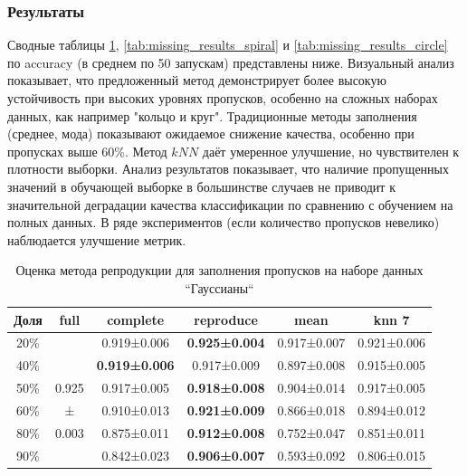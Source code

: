 \subsubsection{Результаты}
Сводные таблицы \cref{tab:missing_results_gaussians}, \cref{tab:missing_results_spiral} и \cref{tab:missing_results_circle} по accuracy (в среднем по 50 запускам) представлены ниже. Визуальный анализ показывает, что предложенный метод демонстрирует более высокую устойчивость при высоких уровнях пропусков, особенно на сложных наборах данных, как например "кольцо и круг". Традиционные методы заполнения (среднее, мода) показывают ожидаемое снижение качества, особенно при пропусках выше 60\%. Метод \(kNN\) даёт умеренное улучшение, но чувствителен к плотности выборки. Анализ результатов показывает, что наличие пропущенных значений в обучающей выборке в большинстве случаев не приводит к значительной деградации качества классификации по сравнению с обучением на полных данных. В ряде экспериментов (если количество пропусков невелико) наблюдается улучшение метрик.

\begin{table} [htbp]
    \centering
    \begin{threeparttable}
        \caption{Оценка метода репродукции для заполнения пропусков на наборе данных ``Гауссианы``}\label{tab:missing_results_gaussians}
        \begin{SingleSpace}
        \begin{tabular}{|c|c|c|c|c|c|}
            \hline
            Доля & full & complete & reproduce & mean & knn 7 \\
            \hline
            20\% &       & 0.919±0.006 & \textbf{0.925±0.004} & 0.917±0.007 & 0.921±0.006 \\
            40\% &       & \textbf{0.919±0.006} & 0.917±0.009 & 0.897±0.008 & 0.915±0.005 \\
            50\% & 0.925 & 0.917±0.005 & \textbf{0.918±0.008} & 0.904±0.014 & 0.917±0.005 \\
            60\% &   ±   & 0.910±0.013 & \textbf{0.921±0.009} & 0.866±0.018 & 0.894±0.012 \\
            80\% & 0.003 & 0.875±0.011 & \textbf{0.912±0.008} & 0.752±0.047 & 0.851±0.011 \\
            90\% &       & 0.842±0.023 & \textbf{0.906±0.007} & 0.593±0.092 & 0.806±0.015 \\
            \hline
        \end{tabular}
        \end{SingleSpace}
    \end{threeparttable}
\end{table}


